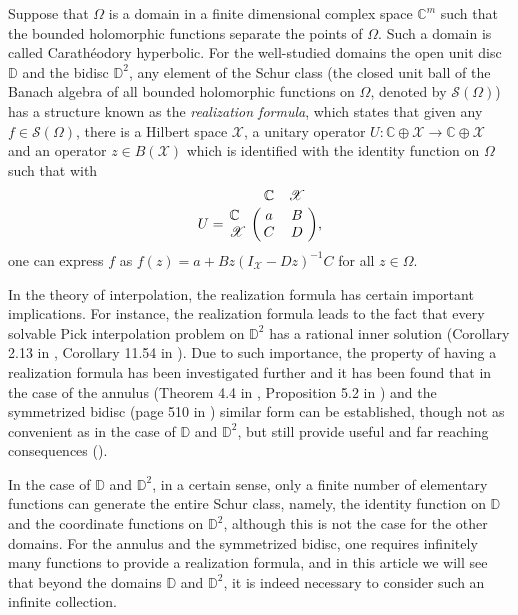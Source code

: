 \documentclass[12pt]{amsart}
\theoremstyle{definition}
\numberwithin{equation}{section}
\newcommand{\X}{\mathscr{X}}
\newcommand{\D}{\mathbb{D}}
\begin{document}
Suppose that $\Omega$ is a domain in a finite dimensional complex space $\mathbb{C}^m$ such that the bounded holomorphic functions separate the points of $\Omega$. Such a domain is called Carath\'eodory hyperbolic. For the well-studied domains the open unit disc $\D$ and the bidisc $\D^2$, any element of the Schur class (the closed unit ball of the Banach algebra of all bounded holomorphic functions on $\Omega$, denoted by $\mathscr{S}(\Omega)$) has a structure known as the \textit{realization formula}, which states that given any $f\in \mathscr{S}(\Omega)$, there is a Hilbert space $\X$, a unitary operator $U:\mathbb{C}\oplus \X\rightarrow \mathbb{C}\oplus \X$ and an operator $z\in B(\X)$ which is identified with the identity function on $\Omega$ such that with $$ U =
\bordermatrix{ & \mathbb{C} & \X \cr
	\mathbb{C} & a & B \cr
	\X & C & D},
$$ one can express $f$ as $f(z)=a+Bz(I_{\X}-Dz)^{-1}C$ for all $z\in \Omega$.

In the theory of interpolation, the realization formula has certain important implications. For instance, the realization formula leads to the fact that every solvable Pick interpolation problem on $\D^2$ has a rational inner solution (Corollary 2.13 in \cite{A-M-Paper}, Corollary 11.54 in \cite{A-M}). Due to such importance, the property of having a realization formula has been investigated further and it has been found that in the case of the annulus (Theorem 4.4 in \cite{B_H}, Proposition 5.2 in \cite{D-M}) and the symmetrized bidisc (page 510 in \cite{B-S}) similar form can be established, though not as convenient as in the case of $\D$ and $\D^2$, but still provide useful and far reaching consequences (\cite{BhatBisCha}). 

In the case of $\D$ and $\D^2$, in a certain sense, only a finite number of elementary functions can generate the entire Schur class, namely, the identity function on $\D$ and the coordinate functions on $\D^2$, although this is not the case for the other domains. For the annulus and the symmetrized bidisc, one requires infinitely many functions to provide a realization formula, and in this article we will see that beyond the domains $\D$ and $\D^2$, it is indeed necessary to consider such an infinite collection.
\end{document}
